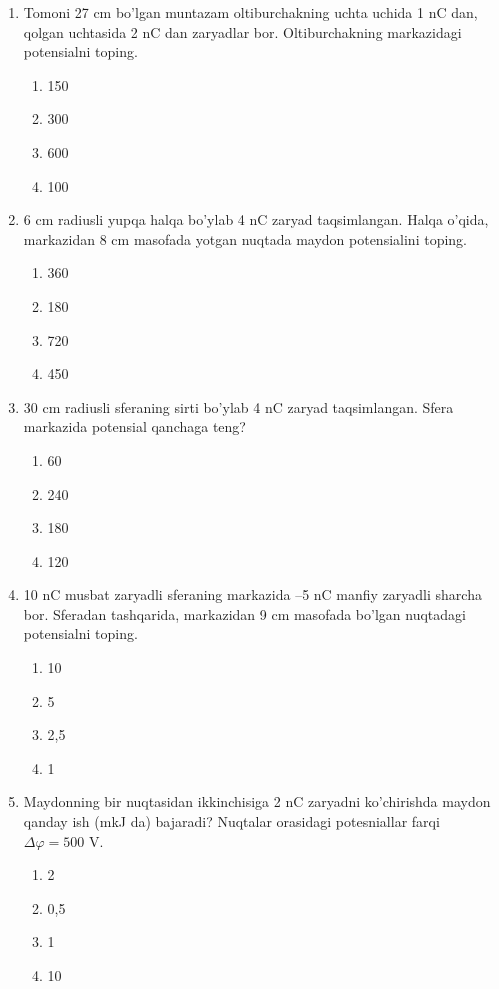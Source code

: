 \begin{enumerate}
    \item Tomoni 27 cm bo’lgan muntazam oltiburchakning uchta uchida 1 nC dan, qolgan uchtasida 2 nC dan zaryadlar bor. Oltiburchakning markazidagi potensialni toping.
    \begin{enumerate}[label=\Alph*)]
        \item 150
        \item 300 %
        \item 600
        \item 100
    \end{enumerate}

    \item 6 cm radiusli yupqa halqa bo’ylab 4 nC zaryad taqsimlangan. Halqa o’qida, markazidan 8 cm masofada yotgan nuqtada maydon potensialini toping.
    \begin{enumerate}[label=\Alph*)]
        \item 360 %
        \item 180
        \item 720
        \item 450
    \end{enumerate}

    \item 30 cm radiusli sferaning sirti bo’ylab 4 nC zaryad taqsimlangan. Sfera markazida potensial qanchaga teng?
    \begin{enumerate}[label=\Alph*)]
        \item 60
        \item 240
        \item 180
        \item 120 %
    \end{enumerate}

    \item 10 nC musbat zaryadli sferaning markazida –5 nC manfiy zaryadli sharcha bor. Sferadan tashqarida, markazidan 9 cm masofada bo’lgan nuqtadagi potensialni toping.
    \begin{enumerate}[label=\Alph*)]
        \item 10
        \item 5 %
        \item 2,5
        \item 1
    \end{enumerate}

    \item Maydonning bir nuqtasidan ikkinchisiga 2 nC zaryadni ko’chirishda maydon qanday ish (mkJ da) bajaradi? 
    Nuqtalar orasidagi potesniallar farqi $\Delta \varphi = 500$ V.
    \begin{enumerate}[label=\Alph*)]
        \item 2
        \item 0,5
        \item 1 %
        \item 10
    \end{enumerate}


\end{enumerate}
